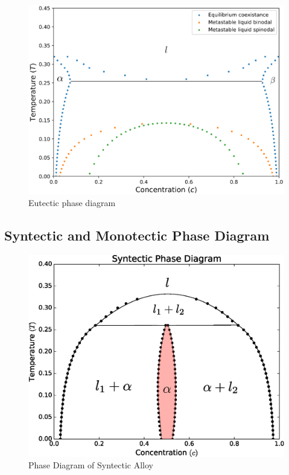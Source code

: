 \documentclass[showkeys, prb, reprint]{revtex4-1}
\begin{document}
\begin{figure}
	\includegraphics{eutectic.eps}
	\caption{\label{eutectic} Eutectic phase diagram}
\end{figure}

\subsection{Syntectic and Monotectic Phase Diagram}

\begin{figure}
	\includegraphics[scale=0.4]{syntectic.eps}
	\caption{\label{syntectic} Phase Diagram of Syntectic Alloy}
\end{figure}
\end{document}
